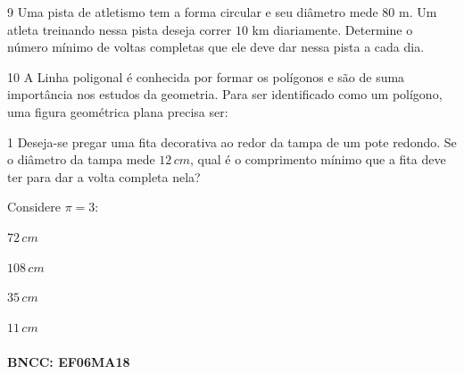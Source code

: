 {


\num{9}  Uma pista de atletismo tem a forma circular e seu diâmetro mede $80$ m.
Um atleta treinando nessa pista deseja correr $10$ km diariamente.
Determine o número mínimo de voltas completas que ele deve dar nessa
pista a cada dia.


\num{10} A Linha poligonal é conhecida por formar os polígonos e são de suma
importância nos estudos da geometria. Para ser identificado como um
polígono, uma figura geométrica plana precisa ser:



\num{1}  Deseja-se pregar uma fita decorativa ao redor da tampa de um pote
redondo. Se o diâmetro da tampa mede $12\,cm$, qual é o comprimento mínimo
que a fita deve ter para dar a volta completa nela?

Considere $π = 3$:

\begin{escolha}
\item $72\,cm$
\item $108\,cm$
\item $35\,cm$
\item $11\,cm$
\end{escolha}

\paragraph{BNCC: EF06MA18 }


}

